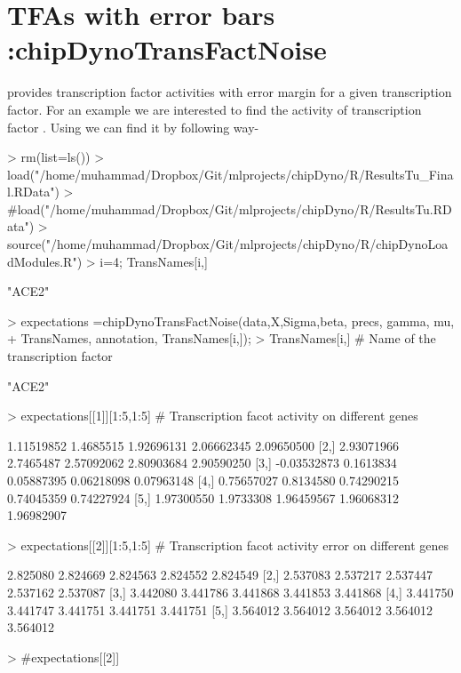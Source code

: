 \documentclass{article}
\begin{document}
\section{TFAs with error bars :chipDynoTransFactNoise}
 provides transcription factor activities with error margin for a given transcription factor. For an example we are interested to find the activity of transcription factor . Using  we can find it by following way-


\begin{Schunk}
\begin{Sinput}
> rm(list=ls())
> load("/home/muhammad/Dropbox/Git/mlprojects/chipDyno/R/ResultsTu_Final.RData")
> #load("/home/muhammad/Dropbox/Git/mlprojects/chipDyno/R/ResultsTu.RData")
> source("/home/muhammad/Dropbox/Git/mlprojects/chipDyno/R/chipDynoLoadModules.R")
> i=4; TransNames[i,]
\end{Sinput}
\begin{Soutput}
[1] "ACE2"
\end{Soutput}
\begin{Sinput}
> expectations =chipDynoTransFactNoise(data,X,Sigma,beta, precs, gamma, mu,
+                                      TransNames, annotation, TransNames[i,]);
> TransNames[i,] # Name of the transcription factor
\end{Sinput}
\begin{Soutput}
[1] "ACE2"
\end{Soutput}
\begin{Sinput}
> expectations[[1]][1:5,1:5] # Transcription facot activity on different genes
\end{Sinput}
\begin{Soutput}
            [,1]      [,2]       [,3]       [,4]       [,5]
[1,]  1.11519852 1.4685515 1.92696131 2.06662345 2.09650500
[2,]  2.93071966 2.7465487 2.57092062 2.80903684 2.90590250
[3,] -0.03532873 0.1613834 0.05887395 0.06218098 0.07963148
[4,]  0.75657027 0.8134580 0.74290215 0.74045359 0.74227924
[5,]  1.97300550 1.9733308 1.96459567 1.96068312 1.96982907
\end{Soutput}
\begin{Sinput}
> expectations[[2]][1:5,1:5] # Transcription facot activity error on different genes
\end{Sinput}
\begin{Soutput}
         [,1]     [,2]     [,3]     [,4]     [,5]
[1,] 2.825080 2.824669 2.824563 2.824552 2.824549
[2,] 2.537083 2.537217 2.537447 2.537162 2.537087
[3,] 3.442080 3.441786 3.441868 3.441853 3.441868
[4,] 3.441750 3.441747 3.441751 3.441751 3.441751
[5,] 3.564012 3.564012 3.564012 3.564012 3.564012
\end{Soutput}
\begin{Sinput}
> #expectations[[2]]
\end{Sinput}
\end{Schunk}
\end{document}
